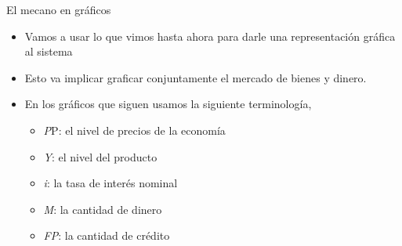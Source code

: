 \documentclass{beamer}
\begin{document}
\begin{frame}{El mecano en gráficos}

\begin{itemize}
    \item Vamos a usar lo que vimos hasta ahora para darle una representación gráfica al sistema 
    \item Esto va implicar graficar conjuntamente el mercado de bienes y dinero.
    \item En los gráficos que siguen usamos la siguiente terminología, 
    \begin{itemize}
        \item \textit{P}P: el nivel de precios de la economía
        \item \textit{Y}: el nivel del producto
        \item \textit{i}: la tasa de interés nominal
        \item \textit{M}: la cantidad de dinero
        \item \textit{FP}: la cantidad de crédito
    \end{itemize}
\end{itemize}

\end{frame}
\end{document}
